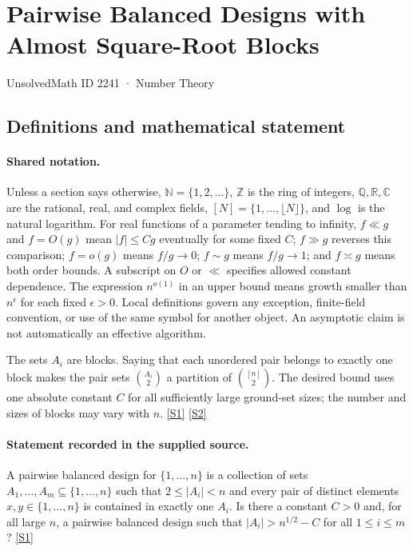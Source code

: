 \documentclass[11pt,a4paper]{article}
\newcommand{\N}{\mathbb{N}}
\newcommand{\Z}{\mathbb{Z}}
\newcommand{\Q}{\mathbb{Q}}
\newcommand{\R}{\mathbb{R}}
\newcommand{\C}{\mathbb{C}}
\newcommand{\sref}[2]{\hyperlink{source:#1:#2}{[S#2]}}
\begin{document}

\setcounter{section}{2240}

\section{Pairwise Balanced Designs with Almost Square-Root Blocks}\label{2241}

{\small\sffamily UnsolvedMath ID 2241 · Number Theory}

\subsection{Definitions and mathematical statement}

\paragraph{Shared notation.}Unless a section says otherwise, $\N=\{1,2,\ldots\}$,
$\Z$ is the ring of integers, $\Q,\R,\C$ are the rational, real, and complex
fields, $[N]=\{1,\ldots,\lfloor N\rfloor\}$, and $\log$ is the natural
logarithm. For real functions of a parameter tending to infinity,
$f\ll g$ and $f=O(g)$ mean $|f|\leq Cg$ eventually for some fixed $C$;
$f\gg g$ reverses this comparison; $f=o(g)$ means $f/g\to0$;
$f\sim g$ means $f/g\to1$; and $f\asymp g$ means both order bounds.
A subscript on $O$ or $\ll$ specifies allowed constant dependence.
The expression $n^{o(1)}$ in an upper bound means growth smaller than
$n^\epsilon$ for each fixed $\epsilon>0$. Local definitions govern any
exception, finite-field convention, or use of the same symbol for another
object. An asymptotic claim is not automatically an effective algorithm.



The sets $A_i$ are blocks. Saying that each unordered pair belongs to exactly one block makes the pair sets $\binom{A_i}{2}$ a partition of $\binom{[n]}2$. The desired bound uses one absolute constant $C$ for all sufficiently large ground-set sizes; the number and sizes of blocks may vary with $n$. \sref{2241}{1} \sref{2241}{2}

\paragraph{Statement recorded in the supplied source.}
A pairwise balanced design for $\{1,\ldots,n\}$ is a collection of sets $A_1,\ldots,A_m\subseteq \{1,\ldots,n\}$ such that $2\leq \lvert A_i\rvert <n$ and every pair of distinct elements $x,y\in \{1,\ldots,n\}$ is contained in exactly one $A_i$.
Is there a constant $C>0$ and, for all large $n$, a pairwise balanced design such that $ \lvert A_i\rvert > n^{1/2}-C $ for all $1\leq i\leq m$? \sref{2241}{1}
\end{document}
